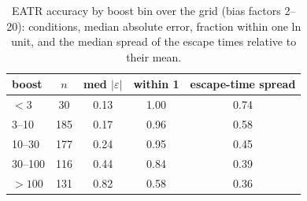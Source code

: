\begin{table}[H]\centering
\caption{EATR accuracy by boost bin over the grid (bias factors 2--20): conditions, median absolute error, fraction within one ln unit, and the median spread of the escape times relative to their mean.}\label{tab:s11}
\begin{tabular}{lcccc}\toprule
boost & $n$ & med $|\varepsilon|$ & within 1 & escape-time spread\\ \midrule
$<3$ & 30 & 0.13 & 1.00 & 0.74 \\
3--10 & 185 & 0.17 & 0.96 & 0.58 \\
10--30 & 177 & 0.24 & 0.95 & 0.45 \\
30--100 & 116 & 0.44 & 0.84 & 0.39 \\
$>100$ & 131 & 0.82 & 0.58 & 0.36\\ \bottomrule
\end{tabular}
\end{table}
